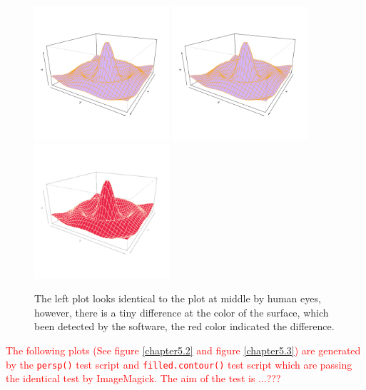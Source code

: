 \documentclass[paper=a4, fontsize=11pt]{report}
\begin{document}
\begin{figure}[h!]
	\begin{center}
		\includegraphics[height = 5cm, width = 5cm]{figure/Chapter5_example_01.pdf}
		\includegraphics[height = 5cm, width = 5cm]{figure/Chapter5_example_02.pdf}
		\includegraphics[height = 5cm, width = 5cm]{figure/Chapter5_example_03.pdf}
		\caption{The left plot looks identical to the plot at middle by human eyes, however, there is a tiny difference at the color of the surface, which been detected by the software, the red color indicated the difference.}
		\label{chapter5.1}
	\end{center}
\end{figure}

\textcolor{red}{
	The following plots (See figure \ref{chapter5.2} and figure \ref{chapter5.3}) are generated by the \texttt{persp()} test script and \texttt{filled.contour()} test script which are passing the identical test by ImageMagick. The aim of the test is ...???
}
\end{document}
